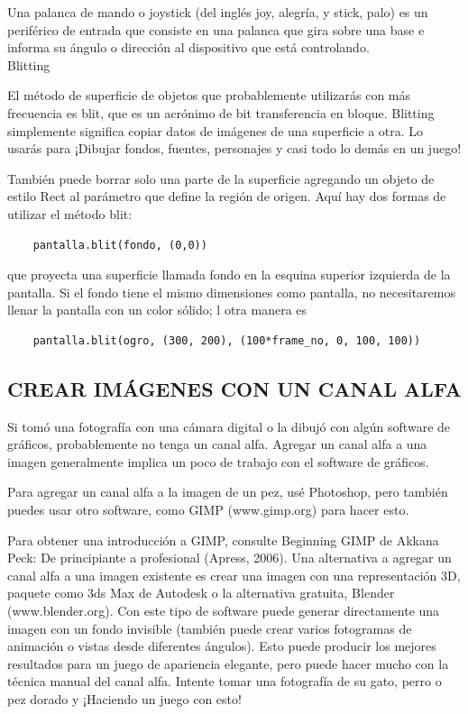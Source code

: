 Una palanca de mando o joystick (del inglés joy, alegría, y stick, palo) es un periférico de entrada que consiste en una palanca que gira sobre una base e informa su ángulo o dirección al dispositivo que está controlando.  \\





Blitting

El método de superficie de objetos que probablemente utilizarás con más frecuencia es blit, que es un acrónimo de bit
transferencia en bloque. Blitting simplemente significa copiar datos de imágenes de una superficie a otra. Lo usarás para
¡Dibujar fondos, fuentes, personajes y casi todo lo demás en un juego!

También puede borrar solo una parte de la superficie agregando un objeto de estilo Rect al parámetro que define la
región de origen. Aquí hay dos formas de utilizar el método blit:
\begin{lstlisting}
	pantalla.blit(fondo, (0,0))
\end{lstlisting}
que proyecta una superficie llamada fondo en la esquina superior izquierda de la pantalla. Si el fondo tiene el mismo
dimensiones como pantalla, no necesitaremos llenar la pantalla con un color sólido; l otra manera es
\begin{lstlisting}
	pantalla.blit(ogro, (300, 200), (100*frame_no, 0, 100, 100))
\end{lstlisting}	




\subsection{CREAR IMÁGENES CON UN CANAL ALFA}

Si tomó una fotografía con una cámara digital o la dibujó con algún software de gráficos, probablemente no 
tenga un canal alfa. Agregar un canal alfa a una imagen generalmente implica un poco de trabajo con el software de gráficos.

Para agregar un canal alfa a la imagen de un pez, usé Photoshop, pero también puedes usar otro software, 
como GIMP (www.gimp.org) para hacer esto. 

Para obtener una introducción a GIMP, consulte Beginning GIMP de Akkana Peck:
De principiante a profesional (Apress, 2006). Una alternativa a agregar un canal alfa a una imagen existente es 
crear una imagen con una representación 3D, paquete como 3ds Max de Autodesk o la alternativa gratuita, Blender (www.blender.org). 
Con este tipo de software puede generar directamente una imagen con un fondo invisible (también puede crear varios fotogramas de
animación o vistas desde diferentes ángulos). Esto puede producir los mejores resultados para un juego de apariencia elegante, 
pero puede hacer mucho con la técnica manual del canal alfa. 
Intente tomar una fotografía de su gato, perro o pez dorado y ¡Haciendo un juego con esto!








